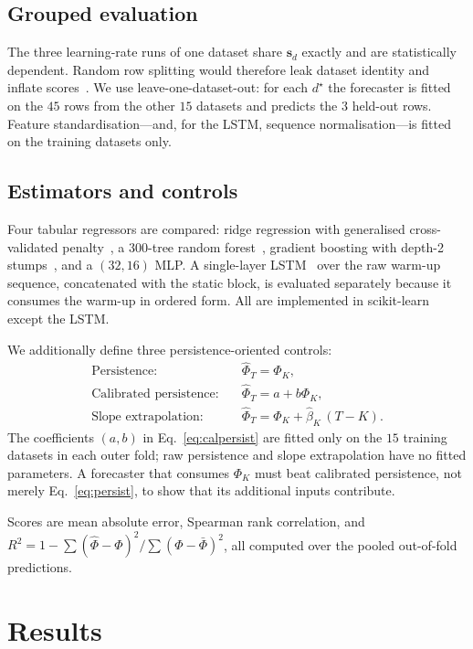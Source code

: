\documentclass[manuscript,nonacm]{acmart}
\begin{document}
\subsection{Grouped evaluation}
The three learning-rate runs of one dataset share $\mathbf{s}_d$ exactly and are
statistically dependent. Random row splitting would therefore leak dataset identity and
inflate scores~\cite{cawley2010overfitting}. We use leave-one-dataset-out: for each
$d^\star$ the forecaster is fitted on the $45$ rows from the other $15$ datasets and
predicts the $3$ held-out rows. Feature standardisation---and, for the LSTM, sequence
normalisation---is fitted on the training datasets only.

\subsection{Estimators and controls}
Four tabular regressors are compared: ridge regression with generalised
cross-validated penalty~\cite{hoerl1970ridge}, a $300$-tree random
forest~\cite{breiman2001rf}, gradient boosting with depth-2
stumps~\cite{friedman2001gbm}, and a $(32,16)$ MLP. A single-layer
LSTM~\cite{hochreiter1997lstm} over the raw warm-up sequence, concatenated with the
static block, is evaluated separately because it consumes the warm-up in ordered form.
All are implemented in scikit-learn~\cite{pedregosa2011sklearn} except the LSTM.

We additionally define three persistence-oriented controls:
\begin{align}
\text{Persistence:}\quad & \hat\Phi_T=\Phi_K, \label{eq:persist}\\
\text{Calibrated persistence:}\quad & \hat\Phi_T=a+b\Phi_K, \label{eq:calpersist}\\
\text{Slope extrapolation:}\quad & \hat\Phi_T=\Phi_K+\hat{\beta}_K\,(T-K). \label{eq:extrap}
\end{align}
The coefficients $(a,b)$ in Eq.~\eqref{eq:calpersist} are fitted only on the $15$
training datasets in each outer fold; raw persistence and slope extrapolation have no
fitted parameters. A forecaster that consumes $\Phi_K$ must beat calibrated persistence,
not merely Eq.~\eqref{eq:persist}, to show that its additional inputs contribute.

Scores are mean absolute error, Spearman rank correlation, and
$R^2=1-\sum(\hat\Phi-\Phi)^2/\sum(\Phi-\bar\Phi)^2$, all computed over the pooled
out-of-fold predictions.

\section{Results}
\end{document}
